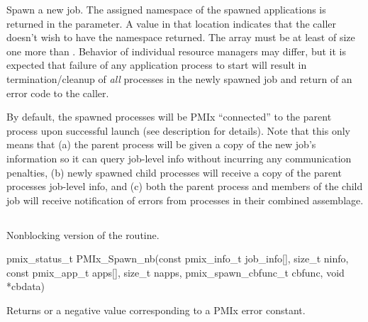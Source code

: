 Spawn a new job.
The assigned namespace of the spawned applications is returned in the  parameter.
A  value in that location indicates that the caller doesn't wish to have the namespace returned.
The  array must be at least of size one more than .
Behavior of individual resource managers may differ, but it is expected that failure of any application process to start will result in termination/cleanup of \emph{all} processes in the newly spawned job and return of an error code to the caller.

By default, the spawned processes will be PMIx ``connected'' to the parent process upon successful launch (see  description for details).
Note that this only means that (a) the parent process will be given a copy of the new job's
information so it can query job-level info without incurring any communication penalties, (b) newly spawned child processes will receive a copy of the parent processes job-level info, and (c) both the parent process and members of the child job will receive notification of errors from processes in their combined assemblage.

\subsection{}

\summary

Nonblocking version of the  routine.

\format

\cspecificstart
\begin{codepar}
pmix_status_t
PMIx_Spawn_nb(const pmix_info_t job_info[], size_t ninfo,
              const pmix_app_t apps[], size_t napps,
              pmix_spawn_cbfunc_t cbfunc, void *cbdata)
\end{codepar}
\cspecificend

\begin{arglist}
\end{arglist}

Returns  or a negative value corresponding to a PMIx error constant.

